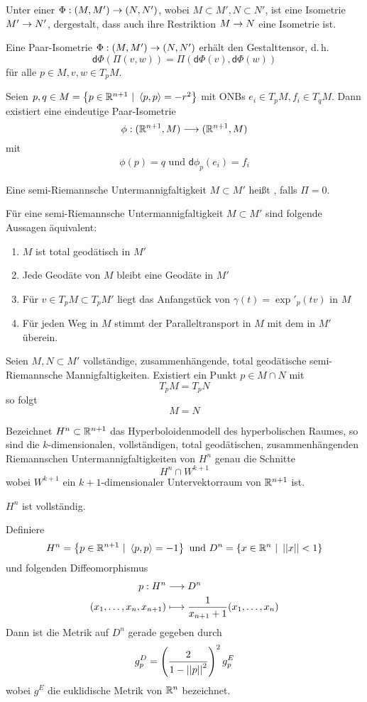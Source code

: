 \documentclass{book}
\renewcommand{\d}{\textsf{d}}
\begin{document}
\Def{}
Unter einer  $\Phi : (M,M') \overset{}{\rightarrow} (N,N')$, wobei $M \subset M', N \subset N'$, ist eine Isometrie $M' \overset{}{\rightarrow} N'$, dergestalt, dass auch ihre Restriktion $M \overset{}{\rightarrow} N$ eine Isometrie ist.

\Lem{}
Eine Paar-Isometrie $\Phi : (M,M') \overset{}{\rightarrow} (N,N')$ erhält den Gestalttensor, d.\,h.
\[ \d \Phi (\Pi (v,w)) = \Pi ( \d \Phi(v),\d \Phi(w) ) \]
für alle $p \in M, v,w \in T_pM$.

\Prop{}
Seien $p,q \in M = \set{p \in \R^{n+1}}{\shrp{p,p} = -r^2}$ mit ONBs $e_i \in T_pM, f_i \in T_qM$. Dann existiert eine eindeutige Paar-Isometrie
\[ \phi : (\mathbb{R}^{n+1}, M) \overset{}{\longrightarrow} (\mathbb{R}^{n+1}, M) \]
mit
\begin{align*}
\phi(p) = q \text{ und } \d \phi_p(e_i) = f_i
\end{align*}


\Def{}
Eine semi-Riemannsche Untermannigfaltigkeit $M \subset M'$ heißt , falls $\Pi = 0$.

\Prop{}
Für eine semi-Riemannsche Untermannigfaltigkeit $M \subset M'$ sind folgende Aussagen äquivalent:
\begin{enumerate}[1.)]
\item $M$ ist total geodätisch in $M'$
\item Jede Geodäte von $M$ bleibt eine Geodäte in $M'$
\item Für $v \in T_pM \subset T_pM'$ liegt das Anfangstück von $\gamma(t) = \exp'_p(tv)$ in $M$
\item Für jeden Weg in $M$ stimmt der Paralleltransport in $M$ mit dem in $M'$ überein.
\end{enumerate}

\Prop{}
Seien $M, N \subset M'$ vollständige, zusammenhängende, total geodätische semi-Riemannsche Mannigfaltigkeiten. Existiert ein Punkt $p \in M\cap N$ mit
\[ T_pM = T_pN \] 
so folgt
\[ M = N\]

\Prop{}
Bezeichnet $H^n \subset \mathbb{R}^{n+1}$ das Hyperboloidenmodell des hyperbolischen Raumes, so sind die $k$-dimensionalen, vollständigen, total geodätischen, zusammenhängenden Riemannschen Untermannigfaltigkeiten von $H^n$ genau die Schnitte
\[ H^n \cap W^{k+1}\]
wobei $W^{k+1}$ ein $k+1$-dimensionaler Untervektorraum von $\mathbb{R}^{n+1}$ ist.

\Kor{}
$H^n$ ist vollständig.

Definiere
\[ H^n = \set{p \in \R^{n+1}}{\shrp{p,p} = -1} \text{ und } D^n = \set{x \in \R^n}{\norm{x} < 1} \]
und folgenden Diffeomorphismus
\begin{align*}
p : H^n & \overset{}{\longrightarrow} D^n\\
(x_1, \ldots, x_n, x_{n+1}) & \longmapsto \frac{1}{x_{n+1} + 1} (x_1,\ldots, x_n) 
\end{align*}
Dann ist die Metrik auf $D^n$ gerade gegeben durch
\[ g^D_p = \left(\frac{2}{1 - \left|\left|p\right|\right|^2}\right)^2g^E_p \]
wobei $g^E$ die euklidische Metrik von $\mathbb{R}^n$ bezeichnet.
\end{document}
